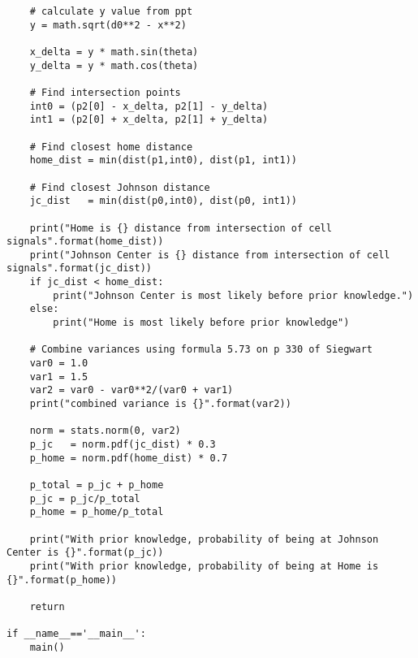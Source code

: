 \documentclass[letter,8pt]{article}
\begin{document}
\begin{enumerate}
\begin{verbatim}
    # calculate y value from ppt
    y = math.sqrt(d0**2 - x**2)

    x_delta = y * math.sin(theta)
    y_delta = y * math.cos(theta)

    # Find intersection points
    int0 = (p2[0] - x_delta, p2[1] - y_delta)
    int1 = (p2[0] + x_delta, p2[1] + y_delta)

    # Find closest home distance
    home_dist = min(dist(p1,int0), dist(p1, int1))

    # Find closest Johnson distance
    jc_dist   = min(dist(p0,int0), dist(p0, int1))

    print("Home is {} distance from intersection of cell signals".format(home_dist))
    print("Johnson Center is {} distance from intersection of cell signals".format(jc_dist))
    if jc_dist < home_dist:
        print("Johnson Center is most likely before prior knowledge.")
    else:
        print("Home is most likely before prior knowledge")

    # Combine variances using formula 5.73 on p 330 of Siegwart
    var0 = 1.0
    var1 = 1.5
    var2 = var0 - var0**2/(var0 + var1)
    print("combined variance is {}".format(var2))

    norm = stats.norm(0, var2)
    p_jc   = norm.pdf(jc_dist) * 0.3
    p_home = norm.pdf(home_dist) * 0.7

    p_total = p_jc + p_home
    p_jc = p_jc/p_total
    p_home = p_home/p_total

    print("With prior knowledge, probability of being at Johnson Center is {}".format(p_jc))
    print("With prior knowledge, probability of being at Home is {}".format(p_home))

    return

if __name__=='__main__':
    main()
  \end{verbatim}


\end{enumerate}
\end{document}
